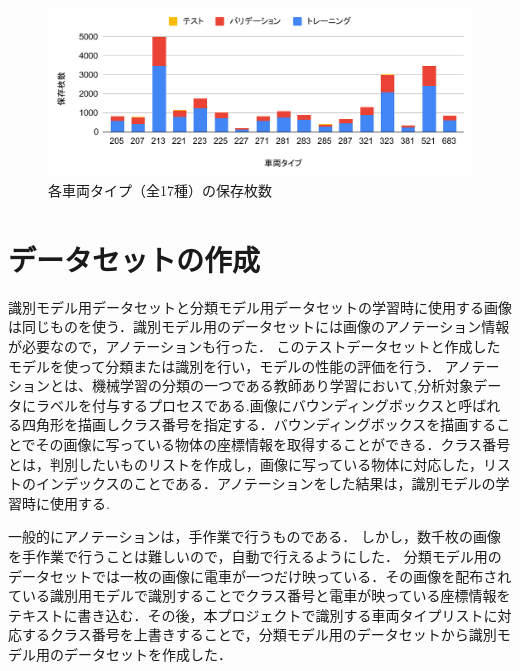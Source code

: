 
\begin{figure}[H]
	\centering
	\includegraphics[width=\linewidth]{chap3/fig/chart2}
	\caption{各車両タイプ（全17種）の保存枚数}
	\label{fig:chart}
\end{figure}



\section{データセットの作成}

識別モデル用データセットと分類モデル用データセットの学習時に使用する画像は同じものを使う．識別モデル用のデータセットには画像のアノテーション情報が必要なので，アノテーションも行った．
このテストデータセットと作成したモデルを使って分類または識別を行い，モデルの性能の評価を行う．
アノテーションとは、機械学習の分類の一つである教師あり学習において,分析対象データにラベルを付与するプロセスである.画像にバウンディングボックスと呼ばれる四角形を描画しクラス番号を指定する．バウンディングボックスを描画することでその画像に写っている物体の座標情報を取得することができる．クラス番号とは，判別したいものリストを作成し，画像に写っている物体に対応した，リストのインデックスのことである．アノテーションをした結果は，識別モデルの学習時に使用する.

一般的にアノテーションは，手作業で行うものである．
しかし，数千枚の画像を手作業で行うことは難しいので，自動で行えるようにした．
分類モデル用のデータセットでは一枚の画像に電車が一つだけ映っている．その画像を配布されている識別用モデルで識別することでクラス番号と電車が映っている座標情報をテキストに書き込む．その後，本プロジェクトで識別する車両タイプリストに対応するクラス番号を上書きすることで，分類モデル用のデータセットから識別モデル用のデータセットを作成した．

